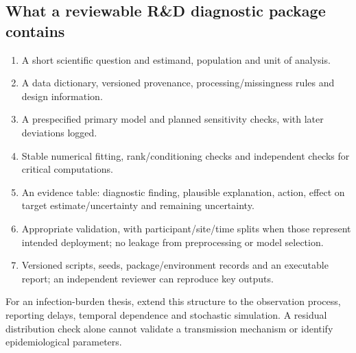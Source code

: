 \documentclass[11pt]{article}
\begin{document}
\subsection{What a reviewable R\&D diagnostic package contains}
\begin{enumerate}
\item A short scientific question and estimand, population and unit of analysis.
\item A data dictionary, versioned provenance, processing/missingness rules and design information.
\item A prespecified primary model and planned sensitivity checks, with later deviations logged.
\item Stable numerical fitting, rank/conditioning checks and independent checks for critical computations.
\item An evidence table: diagnostic finding, plausible explanation, action, effect on target estimate/uncertainty and remaining uncertainty.
\item Appropriate validation, with participant/site/time splits when those represent intended deployment; no leakage from preprocessing or model selection.
\item Versioned scripts, seeds, package/environment records and an executable report; an independent reviewer can reproduce key outputs.
\end{enumerate}
For an infection-burden thesis, extend this structure to the observation process, reporting delays, temporal dependence and stochastic simulation. A residual distribution check alone cannot validate a transmission mechanism or identify epidemiological parameters.
\end{document}
